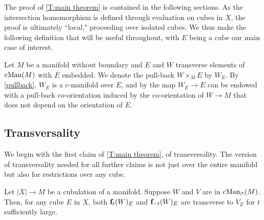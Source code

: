 \bigskip

The proof of \cref{T:main theorem} is contained in the following sections.
As the intersection homomorphism is defined through evaluation on cubes in $X$, the proof is ultimately ``local," proceeding over isolated cubes.
We thus make the following definition that will be useful throughout, with $E$ being a cube our main case of interest.

\begin{definition}
	Let $M$ be a manifold without boundary and $E$ and $W$ transverse elements of $\mathrm{cMan}(M)$ with $E$ embedded.
	We denote the pull-back $W \times_M E$ by $W_E$.
	By \cref{pullback}, $W_E$ is a c-manifold over $E$, and by \cite{medina2022foundations} the map $W_E\to E$ can be endowed with a pull-back co-orientation induced by the co-orientation of $W\to M$ that does not depend on the orientation of $E$.
\end{definition}

\subsection{Transversality}

We begin with the first claim of \cref{T:main theorem}, of transversality.
The version of transversality needed for all further claims
is not just over the entire manifold but also for restrictions over any cube.

\begin{theorem}\label{T:transversality}
	Let $|X| \to M$ be a cubulation of a manifold.
	Suppose $W$ and $V$ are in $\mathrm{cMan}_\pitchfork(M)$.
	Then, for any cube $E$ in $X$, both $\mathbf{f}_t(W)_E$ and $\mathbf{f}_{-t}(W)_E$ are transverse to $V_E$ for $t$ sufficiently large.
\end{theorem}


